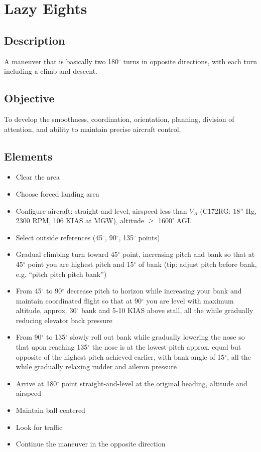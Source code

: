 \section{Lazy Eights}

\subsection{Description}

A maneuver that is basically two 180$^\circ$ turns in opposite directions, with
each turn including a climb and descent.

\subsection{Objective}

To develop the smoothness, coordination, orientation, planning, division of
attention, and ability to maintain precise aircraft control.

\subsection{Elements}

\begin{itemize}
  \item Clear the area
  \item Choose forced landing area
  \item Configure aircraft: straight-and-level, airspeed less than $V_A$
    (C172RG: 18'' Hg, 2300 RPM, 106 KIAS at MGW), altitude $\geq$ 1600' AGL 
  \item Select outside references (45$^\circ$, 90$^\circ$, 135$^\circ$ points)
  \item Gradual climbing turn toward 45$^\circ$ point, increasing pitch and
    bank so that at 45$^\circ$ point you are highest pitch and 15$^\circ$ of
    bank (tip: adjust pitch before bank, e.g. ``pitch pitch pitch bank'') 
  \item From 45$^\circ$ to 90$^\circ$ decrease pitch to horizon while
    increasing your bank and maintain coordinated flight so that at 90$^\circ$
    you are level with maximum altitude, approx. 30$^\circ$ bank and 5-10 KIAS
    above stall, all the while gradually reducing elevator back pressure
  \item From 90$^\circ$ to 135$^\circ$ slowly roll out bank while gradually
    lowering the nose so that upon reaching 135$^\circ$ the nose is at the
    lowest pitch approx. equal but opposite of the highest pitch achieved
    earlier, with bank angle of 15$^\circ$, all the while gradually relaxing
    rudder and aileron pressure
  \item Arrive at 180$^\circ$ point straight-and-level at the original heading,
    altitude and airspeed
  \item Maintain ball centered 
  \item Look for traffic
  \item Continue the maneuver in the opposite direction
\end{itemize}

